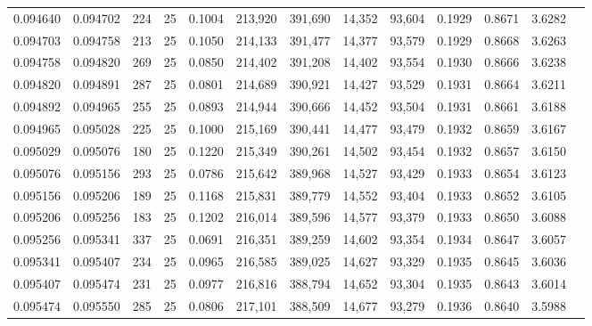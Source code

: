 \begin{tabular}{rrrrrrrrrrrrr}
0.094640 & 0.094702 &   224 &  25 &                                     0.1004 & 213,920 & 391,690 &  14,352 &  93,604 & 0.1929 & 0.8671 & 3.6282 \\
0.094703 & 0.094758 &   213 &  25 &                                     0.1050 & 214,133 & 391,477 &  14,377 &  93,579 & 0.1929 & 0.8668 & 3.6263 \\
0.094758 & 0.094820 &   269 &  25 &                                     0.0850 & 214,402 & 391,208 &  14,402 &  93,554 & 0.1930 & 0.8666 & 3.6238 \\
0.094820 & 0.094891 &   287 &  25 &                                     0.0801 & 214,689 & 390,921 &  14,427 &  93,529 & 0.1931 & 0.8664 & 3.6211 \\
0.094892 & 0.094965 &   255 &  25 &                                     0.0893 & 214,944 & 390,666 &  14,452 &  93,504 & 0.1931 & 0.8661 & 3.6188 \\
0.094965 & 0.095028 &   225 &  25 &                                     0.1000 & 215,169 & 390,441 &  14,477 &  93,479 & 0.1932 & 0.8659 & 3.6167 \\
0.095029 & 0.095076 &   180 &  25 &                                     0.1220 & 215,349 & 390,261 &  14,502 &  93,454 & 0.1932 & 0.8657 & 3.6150 \\
0.095076 & 0.095156 &   293 &  25 &                                     0.0786 & 215,642 & 389,968 &  14,527 &  93,429 & 0.1933 & 0.8654 & 3.6123 \\
0.095156 & 0.095206 &   189 &  25 &                                     0.1168 & 215,831 & 389,779 &  14,552 &  93,404 & 0.1933 & 0.8652 & 3.6105 \\
0.095206 & 0.095256 &   183 &  25 &                                     0.1202 & 216,014 & 389,596 &  14,577 &  93,379 & 0.1933 & 0.8650 & 3.6088 \\
0.095256 & 0.095341 &   337 &  25 &                                     0.0691 & 216,351 & 389,259 &  14,602 &  93,354 & 0.1934 & 0.8647 & 3.6057 \\
0.095341 & 0.095407 &   234 &  25 &                                     0.0965 & 216,585 & 389,025 &  14,627 &  93,329 & 0.1935 & 0.8645 & 3.6036 \\
0.095407 & 0.095474 &   231 &  25 &                                     0.0977 & 216,816 & 388,794 &  14,652 &  93,304 & 0.1935 & 0.8643 & 3.6014 \\
0.095474 & 0.095550 &   285 &  25 &                                     0.0806 & 217,101 & 388,509 &  14,677 &  93,279 & 0.1936 & 0.8640 & 3.5988 \\

\end{tabular}
